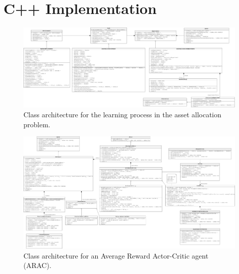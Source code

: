 \section{C++ Implementation}
\label{sec:c++_implementation}



\begin{figure}[ht]
    \includegraphics[width=\textwidth]{Images/agent_environment_interaction}
    \caption{Class architecture for the learning process in the asset allocation problem.}
    \label{fig:PropProf}
\end{figure}

\begin{figure}
    \includegraphics[width=\textwidth]{Images/agent}
    \caption{Class architecture for an Average Reward Actor-Critic agent (ARAC).}
    \label{fig:PropProf}
\end{figure}

\clearpage